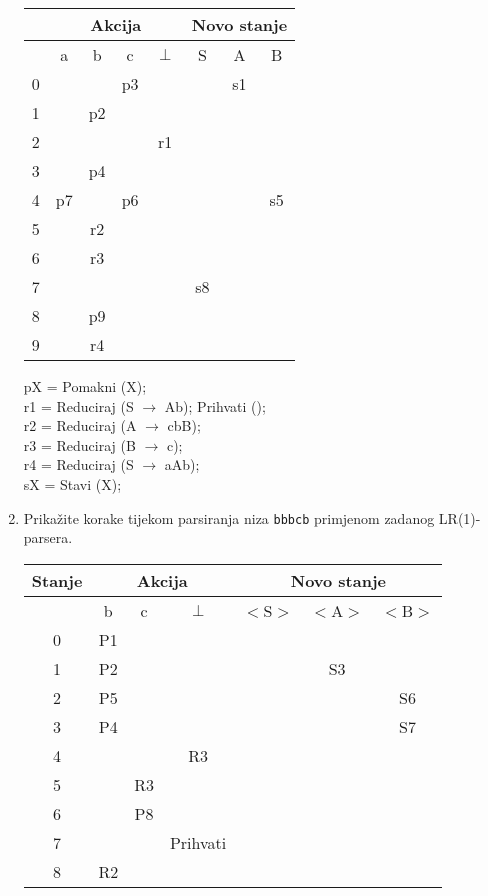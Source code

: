 \documentclass[times, 12pt, utf8]{book}
\begin{document}
\begin{enumerate}[resume]
\begin{tabular}{| c || c | c | c | c || c | c | c | } \hline
& \multicolumn{4}{|c||}{Akcija} & \multicolumn{3}{|c|}{Novo stanje} \\ \hline
& a & b & c & $\perp$ & S & A & B \\ \hline
0 & & & p3 & & & s1 & \\ \hline
1 & & p2 & & & & & \\ \hline
2 & & & & r1 & & & \\ \hline
3 & & p4 & & & & & \\ \hline
4 & p7 & & p6 & & & & s5 \\ \hline
5 & & r2 & & & & & \\ \hline
6 & & r3 & & & & & \\ \hline
7 & & & & & s8 & & \\ \hline
8 & & p9 & & & & & \\ \hline
9 & & r4 & & & & & \\ \hline
\end{tabular}

pX	= Pomakni (X); \\
r1	= Reduciraj (S \(\to\) Ab); Prihvati (); \\
r2	= Reduciraj (A \(\to\) cbB); \\
r3	= Reduciraj (B \(\to\) c); \\
r4	= Reduciraj (S \(\to\) aAb); \\
sX	= Stavi (X); \\ 

\item
Prikažite korake tijekom parsiranja niza \texttt{bbbcb} primjenom zadanog LR(1)-parsera. \cite[str.~141-144]{udzbenik} \cite{auditorne}\\

\begin{tabular}{| c || c | c | c || c | c | c | } \hline
Stanje & \multicolumn{3}{|c||}{Akcija} & \multicolumn{3}{|c|}{Novo stanje} \\ \hline
& b & c & $\perp$ & $<$S$>$ & $<$A$>$ & $<$B$>$ \\ \hline
0 & P1 & & & & & \\ \hline
1 & P2 & & & & S3 & \\ \hline
2 & P5 & & & & & S6 \\ \hline
3 & P4 & & & & & S7 \\ \hline
4 & & & R3 & & & \\ \hline
5 & & R3 & & & & \\ \hline
6 & & P8 & & & & \\ \hline
7 & & & Prihvati & & & \\ \hline
8 & R2 & & & & & \\ \hline
\end{tabular}


\end{enumerate}
\end{document}
